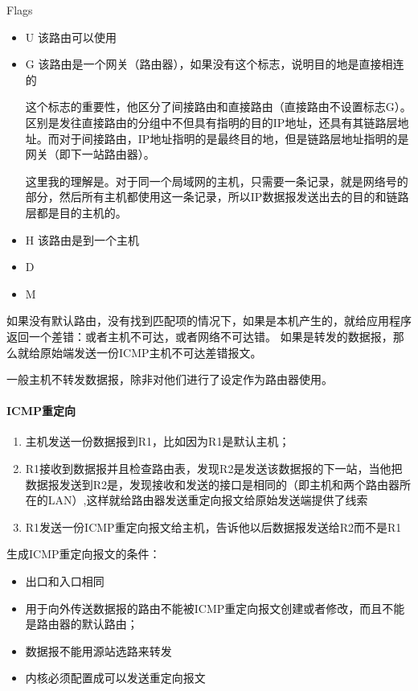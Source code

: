 Flags
\begin{itemize}
\item U 该路由可以使用
\item G 该路由是一个网关（路由器），如果没有这个标志，说明目的地是直接相连的

这个标志的重要性，他区分了间接路由和直接路由（直接路由不设置标志G）。区别是发往直接路由的分组中不但具有指明的目的IP地址，还具有其链路层地址。而对于间接路由，IP地址指明的是最终目的地，但是链路层地址指明的是网关（即下一站路由器）。

这里我的理解是。对于同一个局域网的主机，只需要一条记录，就是网络号的部分，然后所有主机都使用这一条记录，所以IP数据报发送出去的目的和链路层都是目的主机的。

\item H 该路由是到一个主机
\item D
\item M
\end{itemize}

如果没有默认路由，没有找到匹配项的情况下，如果是本机产生的，就给应用程序返回一个差错：或者主机不可达，或者网络不可达错。
如果是转发的数据报，那么就给原始端发送一份ICMP主机不可达差错报文。

一般主机不转发数据报，除非对他们进行了设定作为路由器使用。

\paragraph{ICMP重定向}
\begin{enumerate}
\item 主机发送一份数据报到R1，比如因为R1是默认主机；
\item R1接收到数据报并且检查路由表，发现R2是发送该数据报的下一站，当他把数据报发送到R2是，发现接收和发送的接口是相同的（即主机和两个路由器所在的LAN）,这样就给路由器发送重定向报文给原始发送端提供了线索
\item R1发送一份ICMP重定向报文给主机，告诉他以后数据报发送给R2而不是R1
\end{enumerate}


生成ICMP重定向报文的条件：
\begin{itemize}
\item 出口和入口相同
\item 用于向外传送数据报的路由不能被ICMP重定向报文创建或者修改，而且不能是路由器的默认路由；
\item 数据报不能用源站选路来转发
\item 内核必须配置成可以发送重定向报文
\end{itemize}

